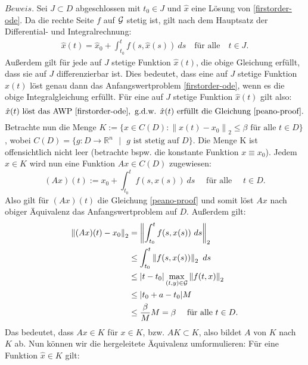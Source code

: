 $Beweis.$ Sei $J\subset D$ abgeschlossen mit $t_0 \in J$ und $\hat{x}$ eine Lösung von \eqref{firstorder-ode}.
Da die rechte Seite $f$ auf ${\cal G}$ stetig ist, gilt nach dem Hauptsatz der Differential- und Integralrechnung:
\begin{align}
    \hat{x}(t) = \hat{x}_0 + \int_{t_0}^{t} f(s, \hat{x}(s))\ ds \quad \text{für alle} \quad t \in J.
    \label{peano-proof}
\end{align}
Außerdem gilt für jede auf $J$ stetige Funktion $\hat{x}(t)$, die obige Gleichung erfüllt, dass sie auf $J$
differenzierbar ist. Dies bedeutet, dass eine auf $J$ stetige Funktion $\hat{x}(t)$ löst genau dann das
Anfangswertproblem \eqref{firstorder-ode}, wenn es die obige Integralgleichung erfüllt. Für eine auf $J$ stetige
Funktion $\hat{x}(t)$ gilt also:
\[
    \hat{x}(t) \text{ löst das AWP \eqref{firstorder-ode}}, \text{ g.d.w. } \hat{x}(t)
    \text{ erfüllt die Gleichung } \eqref{peano-proof}.
\]
Betrachte nun die Menge $K := \{ x \in C(D): \left\lVert x(t) - x_0 \right\rVert_2 \leq \beta \text{ für alle }
t \in D \}$, wobei \linebreak $C(D)=\{g:D \rightarrow \mathbb{R}^n \text{ } | \text{ } g \text{ ist stetig auf } D \}$. Die
Menge K ist offensichtlich nicht leer (betrachte bspw. die konstante Funktion $x \equiv x_0$). Jedem $x \in K$ wird nun eine
Funktion $Ax \in C(D)$ zugewiesen:
\[
    (Ax)(t) := x_0 + \int_{t_0}^{t} f(s, x(s))\ ds \quad \text{ für alle } \quad t \in D.
\]
Also gilt für $(Ax)(t)$ die Gleichung \eqref{peano-proof} und somit löst $Ax$ nach obiger Äquivalenz das
Anfangswertproblem auf $D$. Außerdem gilt:
\begin{align*}
    \left\lVert (Ax)(t) - x_0 \right\rVert_2 &= \left\lVert \int_{t_0}^{t} f(s, x(s))\ ds \right\rVert_2 \\
    &\leq \int_{t_0}^{t} \left\lVert f(s, x(s)) \right\rVert_2\ ds \\
    &\leq |t - t_0| \max_{(t,y)\in {\cal G}}\left\lVert f(t,x)\right\rVert_2 \\
    &\leq |t_0 + a - t_0| M \\
    &\leq \frac{\beta}{M}M = \beta \quad \text{ für alle } t \in D.
\end{align*}
Das bedeutet, dass $Ax \in K$ für $x \in K$, bzw. $AK \subset K$, also bildet $A$ von $K$ nach $K$ ab. Nun können wir die
hergeleitete Äquivalenz umformulieren: Für eine Funktion $\hat{x} \in K$ gilt:
